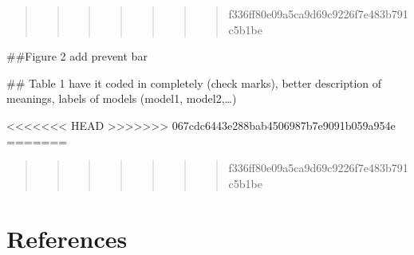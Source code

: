 \documentclass[
]{article}
\begin{document}
\begin{quote}
\begin{quote}
\begin{quote}
\begin{quote}
\begin{quote}
\begin{quote}
\begin{quote}
f336ff80e09a5ca9d69c9226f7e483b791c5b1be
\end{quote}
\end{quote}
\end{quote}
\end{quote}
\end{quote}
\end{quote}
\end{quote}

\#\#Figure 2 add prevent bar

\#\# Table 1 have it coded in completely (check marks), better
description of meanings, labels of models (model1, model2,\ldots)

\begin{table}

\end{table}

\textless\textless\textless\textless\textless\textless\textless{} HEAD
\textgreater\textgreater\textgreater\textgreater\textgreater\textgreater\textgreater{}
067cdc6443e288bab4506987b7e9091b059a954e =======

\begin{quote}
\begin{quote}
\begin{quote}
\begin{quote}
\begin{quote}
\begin{quote}
\begin{quote}
f336ff80e09a5ca9d69c9226f7e483b791c5b1be \clearpage
\end{quote}
\end{quote}
\end{quote}
\end{quote}
\end{quote}
\end{quote}
\end{quote}

\hypertarget{references}{%
\section*{References}\label{references}}
\end{document}
